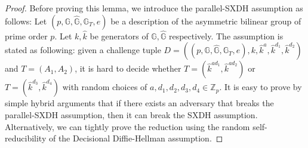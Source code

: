 \documentclass[11pt,letterpaper]{article}
\newcommand{\G}{\mathbb{G}}
\newcommand{\Z}{\mathbb{Z}}
\begin{document}
\begin{proof}
Before proving this lemma, we introduce the parallel-SXDH assumption as
follows: Let $(p, \G, \hat{\G}, \G_T, e)$ be a description of the asymmetric
bilinear group of prime order $p$. Let $k, \hat{k}$ be generators of $\G,
\hat{\G}$ respectively. The assumption is stated as following: given a
challenge tuple
    $D = ((p, \G, \hat{\G}, \G_T, e),
    k, \hat{k}^a, \hat{k}^{d_1}, \hat{k}^{d_2})$ and $T = (A_1, A_2)$,
it is hard to decide whether $T = (\hat{k}^{ad_1}, \hat{k}^{ad_2})$ or $T =
(\hat{k}^{d_3}, \hat{k}^{d_4})$ with random choices of $a, d_1, d_2, d_3, d_4
\in \Z_p$. It is easy to prove by simple hybrid arguments that if there
exists an adversary that breaks the parallel-SXDH assumption, then it can
break the SXDH assumption. Alternatively, we can tightly prove the reduction
using the random self-reducibility of the Decisional Diffie-Hellman
assumption.


\end{proof}
\end{document}
